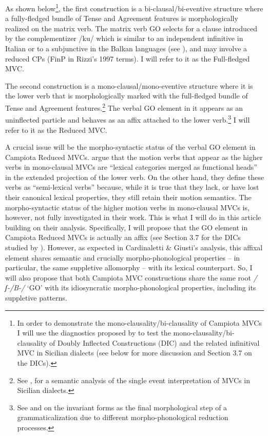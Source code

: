 \documentclass[output=paper]{langscibook}
\begin{document}
As shown below\footnote{In order to demonstrate the mono-clausality/bi-clausality of Campiota MVCs I will use the diagnostics proposed by \citet{cardinaletti2003a} to test the mono-clausality/bi-clausality of Doubly Inflected Constructions (DIC) and the related infinitival MVC in Sicilian dialects (see below for more discussion and Section 3.7 on the DICs).},  the first construction is a bi-clausal/bi-eventive structure where a fully-fledged bundle of Tense and Agreement features is morphologically realized on the matrix verb. The matrix verb GO selects for a clause introduced by the complementizer /ku/ which is similar to an independent infinitive in Italian or to a subjunctive in the Balkan languages (see \citealt{calabrese1993a}), and may involve a reduced CPs (FinP in Rizzi’s 1997 terms).  I will refer to it as the Full-fledged MVC.

The second construction is a mono-clausal/mono-eventive structure where it is the lower verb that is morphologically marked with the full-fledged bundle of Tense and Agreement features.\footnote{See \citet{prete2020a}, \citet{todaro2018a} for a semantic analysis of the single event interpretation of MVCs in Sicilian dialects.}  The verbal GO element in it appears as an uninflected particle and behaves as an affix attached to the lower verb.\footnote{See \citet{cruschina2013a, cruschina2021a} and \citet{ledgeway2016a} on the invariant forms as the final morphological step of a grammaticalization due to different morpho-phonological reduction processes.}  I will refer to it as the Reduced MVC.

A crucial issue will be the morpho-syntactic status of the verbal GO element in Campiota Reduced MVCs. \citet{cardinaletti2003a} argue that the motion verbs that appear as the higher verbs in mono-clausal MVCs are “lexical categories merged as functional heads” in the extended projection of the lower verb. On the other hand, they define these verbs as “semi-lexical verbs” because, while it is true that they lack, or have lost their canonical lexical properties, they still retain their motion semantics. The morpho-syntactic status of the higher motion verbs in mono-clausal MVCs is, however, not fully investigated in their work.  This is what I will do in this article building on their analysis.  Specifically, I will propose that the GO element in Campiota Reduced MVCs is actually an affix (see Section 3.7 for the DICs studied by \citet{cardinaletti2003a}). However, as expected in Cardinaletti \& Giusti’s analysis, this affixal element shares semantic and crucially morpho-phonological properties -- in particular, the same suppletive allomorphy --  with its lexical counterpart.  So, I will also propose that both Campiota MVC constructions share the same root \textit{/ʃ-/B-/} ‘GO’ with its idiosyncratic morpho-phonological properties, including its suppletive patterns.
\end{document}
